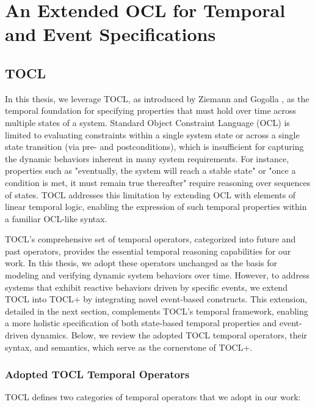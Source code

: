\section{An Extended OCL for Temporal and Event Specifications}

\subsection{TOCL}

\hspace{1cm} In this thesis, we leverage TOCL, as introduced by Ziemann and Gogolla \cite{TOCL}, 
as the temporal foundation for specifying properties that must hold over time across 
multiple states of a system. Standard Object Constraint Language (OCL) is limited to 
evaluating constraints within a single system state or across a single state transition 
(via pre- and postconditions), which is insufficient for capturing the dynamic behaviors 
inherent in many system requirements. For instance, properties such as "eventually, 
the system will reach a stable state" or "once a condition is met, it must remain 
true thereafter" require reasoning over sequences of states. TOCL addresses this limitation 
by extending OCL with elements of linear temporal logic, enabling the expression of such 
temporal properties within a familiar OCL-like syntax.

TOCL's comprehensive set of temporal operators, categorized into future and past 
operators, provides the essential temporal reasoning capabilities for our work. 
In this thesis, we adopt these operators unchanged as the basis for modeling and 
verifying dynamic system behaviors over time. However, to address systems that 
exhibit reactive behaviors driven by specific events, we extend TOCL into TOCL+ 
by integrating novel event-based constructs. This extension, detailed in the next 
section, complements TOCL’s temporal framework, enabling a more holistic specification 
of both state-based temporal properties and event-driven dynamics. Below, we review 
the adopted TOCL temporal operators, their syntax, and semantics, which serve as 
the cornerstone of TOCL+.

\subsubsection{Adopted TOCL Temporal Operators}
TOCL defines two categories of temporal operators that we adopt in our work:

